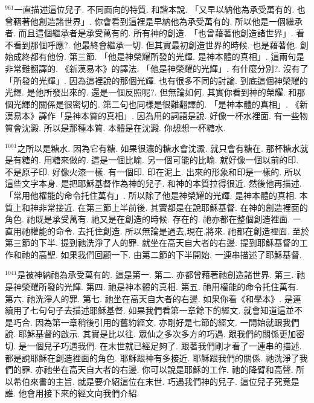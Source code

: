 \documentclass{book}
\begin{document}
$^{961}$一直描述這位兒子.
不同面向的特質.
和諧本說.
「又早以納他為承受萬有的.
也曾藉著他創造諸世界」.
你會看到這裡是早納他為承受萬有的.
所以他是一個繼承者.
而且這個繼承者是承受萬有的.
所有神的創造.
「也曾藉著他創造諸世界」.
看不看到那個呼應?.
他最終會繼承一切.
但其實最初創造世界的時候.
也是藉著他.
創始成終都有他份.
第三節.
「他是神榮耀所發的光輝.
是神本體的真相」.
這兩句是非常難翻譯的.
《新漢易本》的譯法.
「他是神榮耀的光輝」.
有什麼分別?.
沒有了「所發的光輝」.
因為這裡說的那個光輝.
也有很多不同的討論.
到底這個神榮耀的光輝.
是他所發出來的.
還是一個反照呢?.
但無論如何.
其實你看到神的榮耀.
和那個光輝的關係是很密切的.
第二句也同樣是很難翻譯的.
「是神本體的真相」.
《新漢易本》譯作「是神本質的真相」.
因為用的詞語是說.
好像一杯水裡面.
有一些物質會沈澱.
所以是那種本質.
本體是在沈澱.
你想想一杯糖水.

$^{1001}$之所以是糖水.
因為它有糖.
如果很濃的糖水會沈澱.
就只會有糖在.
那杯糖水就是有糖的.
用糖來做的.
這是一個比喻.
另一個可能的比喻.
就好像一個以前的印.
不是原子印.
好像火漆一樣.
有一個印.
印在泥上.
出來的形象和印是一樣的.
所以這些文字本身.
是把耶穌基督作為神的兒子.
和神的本質拉得很近.
然後他再描述.
「常用他權能的命令托住萬有」.
所以除了他是神榮耀的光輝.
是神本體的真相.
本質上和神非常接近.
在第三節上半前後.
其實都是在說耶穌基督.
在神的創造裡面的角色.
祂既是承受萬有.
祂又是在創造的時候.
存在的.
祂亦都在整個創造裡面.
一直用祂權能的命令.
去托住創造.
所以無論是過去,現在,將來.
祂都在創造裡面.
至於第三節的下半.
提到祂洗淨了人的罪.
就坐在高天自大者的右邊.
提到耶穌基督的工作和祂的高聖.
如果我們回顧一下.
由第二節的下半開始.
一連串描述了耶穌基督.

$^{1041}$是被神納祂為承受萬有的.
這是第一.
第二.
亦都曾藉著祂創造諸世界.
第三.
祂是神榮耀所發的光輝.
第四.
祂是神本體的真相.
第五.
祂用權能的命令托住萬有.
第六.
祂洗淨人的罪.
第七.
祂坐在高天自大者的右邊.
如果你看《和學本》.
是連續用了七句句子去描述耶穌基督.
如果我們看第一章餘下的經文.
就會知道這並不是巧合.
因為第一章稍後引用的舊約經文.
亦剛好是七節的經文.
一開始就跟我們說.
耶穌基督的啟示.
其實是比以往.
眾仙之多次多方的巧遇.
跟我們的關係更加密切.
是一個兒子巧遇我們.
在末世就已經足夠了.
跟著我們剛才看了一連串的描述.
都是說耶穌在創造裡面的角色.
耶穌跟神有多接近.
耶穌跟我們的關係.
祂洗淨了我們的罪.
亦祂坐在高天自大者的右邊.
你可以說是耶穌的工作.
祂的降臂和高聲.
所以希伯來書的主旨.
就是要介紹這位在末世.
巧遇我們神的兒子.
這位兒子究竟是誰.
他會用接下來的經文向我們介紹.
\end{document}

